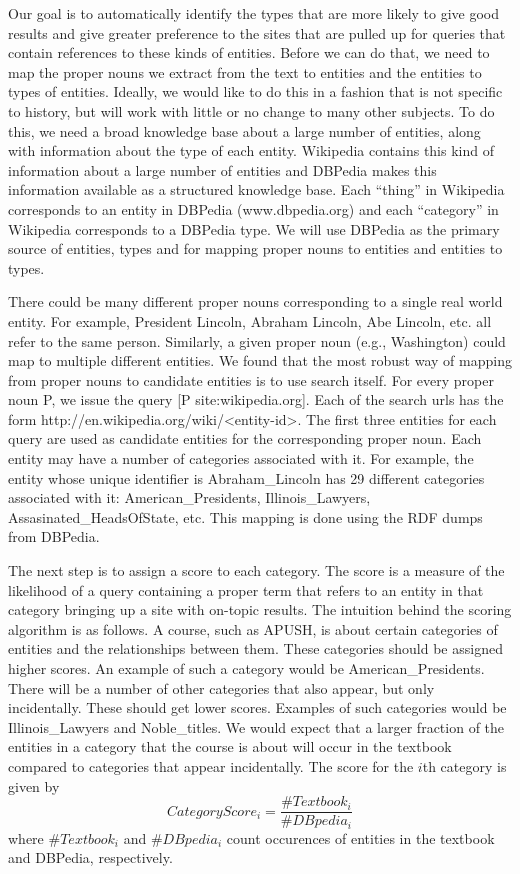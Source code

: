 \documentclass[pdfpagelabels=false,plainpages=true]{acm_proc_article-sp}
\begin{document}
Our goal is to automatically identify the types that are more likely to give
good results and give greater preference to the sites that are pulled up for
queries that contain references to these kinds of entities. Before we can do
that, we need to map the proper nouns we extract from the text to entities and
the entities to types of entities. Ideally, we would like to do this in a
fashion that is not specific to history, but will work with little or no change
to many other subjects. To do this, we need a broad knowledge base about a large
number of entities, along with information about the type of each
entity. Wikipedia contains this kind of information about a large number of
entities and DBPedia makes this information available as a structured knowledge
base. Each ``thing'' in Wikipedia corresponds to an entity in DBPedia
(www.dbpedia.org) and each ``category'' in Wikipedia corresponds to a DBPedia
type. We will use DBPedia as the primary source of entities, types and for
mapping proper nouns to entities and entities to types. 

There could be many different proper nouns corresponding to a single real world
entity. For example, President Lincoln, Abraham Lincoln, Abe Lincoln, etc. all
refer to the same person. Similarly, a given proper noun (e.g., Washington) could
map to multiple different entities. We found that the most robust way of mapping
from proper nouns to candidate entities is to use search itself. For every
proper noun P, we issue the query [P site:wikipedia.org]. Each of the search
urls has the form http://en.wikipedia.org/wiki/<entity-id>. The first three entities
for each query are used as candidate entities for the corresponding proper
noun. Each entity may have a number of categories associated with it. For
example, the entity whose unique identifier is Abraham\_Lincoln has 29
different categories associated with it: American\_Presidents,
Illinois\_Lawyers, Assasinated\_HeadsOfState, etc. This mapping is done using
the RDF dumps from DBPedia. 

The next step is to assign a score to each category. The score is a measure of
the likelihood of a query containing a proper term that refers to an entity in
that category bringing up a site with on-topic results. The intuition behind the
scoring algorithm is as follows. A course, such as APUSH, is about certain
categories of entities and the relationships between them. These categories
should be assigned higher scores. An example of such a category would be
American\_Presidents. There will be a number of other categories that also
appear, but only incidentally. These should get lower scores. Examples of such
categories would be Illinois\_Lawyers and Noble\_titles. We would expect that a
larger fraction of the entities in a category that the course is about will
occur in the textbook compared to categories that appear incidentally. The score
for the $i$th category is given by
\begin{equation}
CategoryScore_i = \frac{\#Textbook_i}{\#DBpedia_i}
\end{equation}
where $\#Textbook_i$ and $\#DBpedia_i$ count occurences of entities in the
textbook and DBPedia, respectively. 
\end{document}
